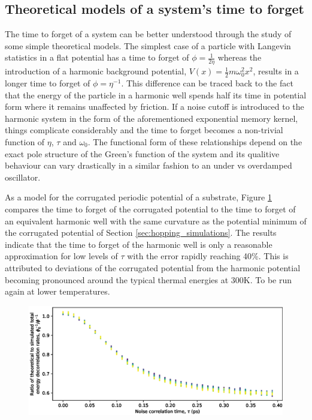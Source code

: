 \documentclass{article}
\newcommand{\K}{\si{\kelvin}}
\begin{document}
\subsection{Theoretical models of a system's time to forget} 

The time to forget of a system can be better understood through the study of some simple theoretical models. The simplest case of a particle with Langevin statistics in a flat potential has a time to forget of $\phi=\frac{1}{2\eta}$ whereas the introduction of a harmonic background potential, $V(x)=\frac{1}{2}m\omega_0^2x^2$, results in a longer time to forget of $\phi=\eta^{-1}$. This difference can be traced back to the fact that the energy of the particle in a harmonic well spends half its time in potential form where it remains unaffected by friction. If a noise cutoff is introduced to the harmonic system in the form of the aforementioned exponential memory kernel, things complicate considerably and the time to forget becomes a non-trivial function of $\eta$, $\tau$ and $\omega_0$. The functional form of these relationships depend on the exact pole structure of the Green's function of the system and its qualitive behaviour can vary drastically in a similar fashion to an under vs overdamped oscillator.

As a model for the corrugated periodic potential of a substrate, Figure \ref{fig:compare_theoretical_ttf} compares the time to forget of the corrugated potential to the time to forget of an equivalent harmonic well with the same curvature as the potential minimum of the corrugated potential of Section \ref{sec:hopping_simulations}. The results indicate that the time to forget of the harmonic well is only a reasonable approximation for low levels of $\tau$ with the error rapidly reaching 40\%. This is attributed to deviations of the corrugated potential from the harmonic potential becoming pronounced around the typical thermal energies at $300\K$. To be run again at lower temperatures. 

\begin{figure}
	\centering
	\includegraphics[width=1.0\textwidth]{theoretical_ttf_comparison}
	\caption{}
	\label{fig:compare_theoretical_ttf}
\end{figure}
\end{document}
